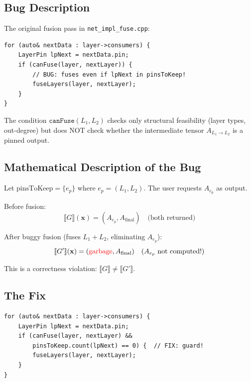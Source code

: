 \documentclass[12pt]{article}
\theoremstyle{definition}
\begin{document}
\subsection{Bug Description}

The original fusion pass in \texttt{net\_impl\_fuse.cpp}:

\begin{verbatim}
for (auto& nextData : layer->consumers) {
    LayerPin lpNext = nextData.pin;
    if (canFuse(layer, nextLayer)) {
        // BUG: fuses even if lpNext in pinsToKeep!
        fuseLayers(layer, nextLayer);
    }
}
\end{verbatim}

The condition $\texttt{canFuse}(L_1, L_2)$ checks only structural feasibility (layer types, out-degree) but does NOT check whether the intermediate tensor $A_{L_1 \to L_2}$ is a pinned output.

\subsection{Mathematical Description of the Bug}

Let $\text{pinsToKeep} = \{e_p\}$ where $e_p = (L_1, L_2)$. The user requests $A_{e_p}$ as output.

Before fusion:
\begin{equation}
\llbracket G \rrbracket(\mathbf{x}) = (A_{e_p}, A_{\text{final}}) \quad \text{(both returned)}
\end{equation}

After buggy fusion (fuses $L_1+L_2$, eliminating $A_{e_p}$):
\begin{equation}
\llbracket G' \rrbracket(\mathbf{x}) = (\textcolor{red}{\text{garbage}}, A_{\text{final}}) \quad \text{(} A_{e_p} \text{ not computed!)}
\end{equation}

This is a correctness violation: $\llbracket G \rrbracket \neq \llbracket G' \rrbracket$.

\subsection{The Fix}

\begin{verbatim}
for (auto& nextData : layer->consumers) {
    LayerPin lpNext = nextData.pin;
    if (canFuse(layer, nextLayer) &&
        pinsToKeep.count(lpNext) == 0) {  // FIX: guard!
        fuseLayers(layer, nextLayer);
    }
}
\end{verbatim}
\end{document}
